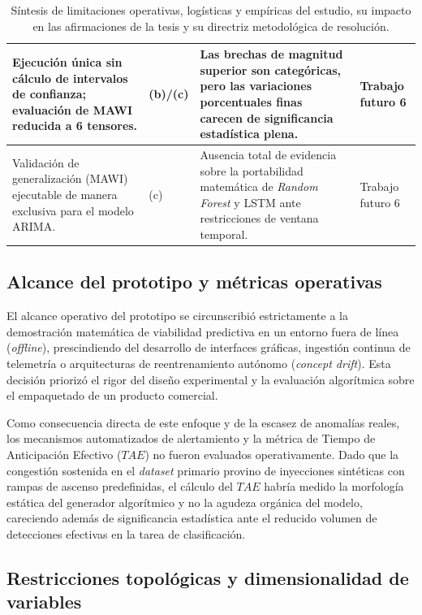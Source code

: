 \documentclass[12pt]{report}
\begin{document}
\begin{table}[H]
\begin{tabular}{|p{4.1cm}|p{1.7cm}|p{4.6cm}|p{2.6cm}|}
        \hline
        Ejecución única sin cálculo de intervalos de confianza; evaluación de MAWI reducida a 6 tensores. & (b)/(c) & Las brechas de magnitud superior son categóricas, pero las variaciones porcentuales finas carecen de significancia estadística plena. & Trabajo futuro 6 \\
        \hline
        Validación de generalización (MAWI) ejecutable de manera exclusiva para el modelo ARIMA. & (c) & Ausencia total de evidencia sobre la portabilidad matemática de \textit{Random Forest} y LSTM ante restricciones de ventana temporal. & Trabajo futuro 6 \\
        \hline
    \end{tabular}
    \caption{Síntesis de limitaciones operativas, logísticas y empíricas del estudio, su impacto en las afirmaciones de la tesis y su directriz metodológica de resolución.}
    \label{tab:limitaciones_resumen}
\end{table}

\subsection*{Alcance del prototipo y métricas operativas}

El alcance operativo del prototipo se circunscribió estrictamente a la demostración matemática de viabilidad predictiva en un entorno fuera de línea (\textit{offline}), prescindiendo del desarrollo de interfaces gráficas, ingestión continua de telemetría o arquitecturas de reentrenamiento autónomo (\textit{concept drift}). Esta decisión priorizó el rigor del diseño experimental y la evaluación algorítmica sobre el empaquetado de un producto comercial. 

Como consecuencia directa de este enfoque y de la escasez de anomalías reales, los mecanismos automatizados de alertamiento y la métrica de Tiempo de Anticipación Efectivo ($TAE$) no fueron evaluados operativamente. Dado que la congestión sostenida en el \textit{dataset} primario provino de inyecciones sintéticas con rampas de ascenso predefinidas, el cálculo del $TAE$ habría medido la morfología estática del generador algorítmico y no la agudeza orgánica del modelo, careciendo además de significancia estadística ante el reducido volumen de detecciones efectivas en la tarea de clasificación.
\subsection*{Restricciones topológicas y dimensionalidad de variables}
\end{document}
